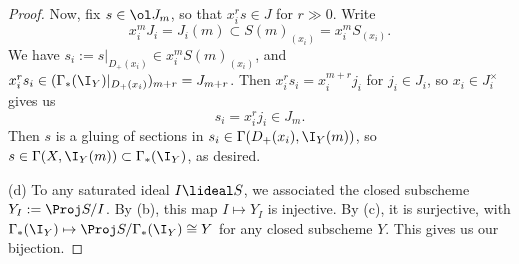 \documentclass[12pt]{amsart}
\begin{document}
\begin{proof}
  Now, fix $s\in \ol J_m$, so that $x_i^rs\in J$ for $r\gg0$.
  Write
  \[
    x_i^mJ_i=J_i(m)\subset S(m)_{(x_i)}=x_i^m S_{(x_i)}.
  \] 
  We have $s_i:=s|_{D_+(x_i)}\in x_i^mS(m)_{(x_i)}$, and $x_i^rs_i \in (\Gamma_*(\I_Y)|_{D_+(x_i)})_{m+r}=J_{m+r}$.
  Then $x_i^rs_i=x_i^{m+r}j_i$ for $j_i\in J_i$, so $x_i\in J_i^\times$ gives us
  \[
    s_i=x_i^rj_i\in J_m.
  \] 
  Then $s$ is a gluing of sections in $s_i\in\Gamma(D_+(x_i),\I_Y(m))$, so $s\in \Gamma(X,\I_Y(m))\subset \Gamma_*(\I_Y)$, as desired.

  (d) To any saturated ideal $I\lideal S$, we associated the closed subscheme $Y_I:=\Proj S/I$.
  By (b), this map $I\mapsto Y_I$ is injective.
  By (c), it is surjective, with $\Gamma_*(\I_Y)\mapsto \Proj S/\Gamma_*(\I_Y)\cong Y$ for any closed subscheme $Y$.
  This gives us our bijection.
  
\end{proof}
\end{document}
